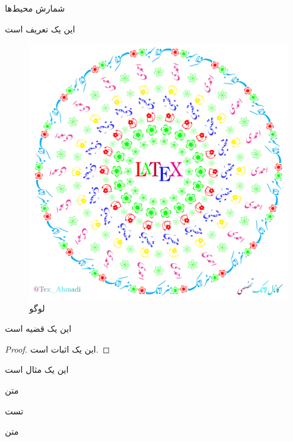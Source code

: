 \documentclass[10pt,xcolor=dvipsnames]{beamer}
\begin{document}
\begin{frame}{شمارش محیط‌ها}
\begin{definition}
این یک تعریف است
\begin{figure}
\centering
\includegraphics[scale=.02]{logo1.png} 
\caption{لوگو}
\end{figure}
\end{definition}
\pause

\begin{theorem}
این یک قضیه است
\end{theorem}
\pause

\begin{proof}
این یک اثبات است.
\end{proof}

\end{frame}
\begin{frame}
\begin{example}
این یک مثال است
\end{example}
\begin{corollary}
متن
\end{corollary}

\begin{proposition}
تست
\end{proposition}
\begin{lemma}
متن
\end{lemma}
\end{frame}
\end{document}
